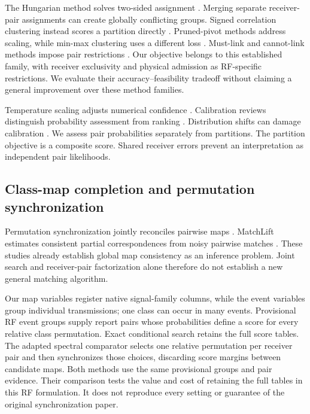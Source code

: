 The Hungarian method solves two-sided assignment \cite{kuhn}. Merging separate receiver-pair assignments can create globally conflicting groups. Signed correlation clustering instead scores a partition directly \cite{bansal}. Pruned-pivot methods address scaling, while min-max clustering uses a different loss \cite{dalirrooyfard2024,heidrich2024}. Must-link and cannot-link methods impose pair restrictions \cite{baumann2025}. Our objective belongs to this established family, with receiver exclusivity and physical admission as RF-specific restrictions. We evaluate their accuracy--feasibility tradeoff without claiming a general improvement over these method families.

Temperature scaling adjusts numerical confidence \cite{guo}. Calibration reviews distinguish probability assessment from ranking \cite{silvafilho2023,zhangwang2026}. Distribution shifts can damage calibration \cite{gawlikowski2023,seligmann2023,liang2024}. We assess pair probabilities separately from partitions. The partition objective is a composite score. Shared receiver errors prevent an interpretation as independent pair likelihoods.

\subsection{Class-map completion and permutation synchronization}
Permutation synchronization jointly reconciles pairwise maps \cite{pachauri2013}. MatchLift estimates consistent partial correspondences from noisy pairwise matches \cite{chen2014}. These studies already establish global map consistency as an inference problem. Joint search and receiver-pair factorization alone therefore do not establish a new general matching algorithm.

Our map variables register native signal-family columns, while the event variables group individual transmissions; one class can occur in many events. Provisional RF event groups supply report pairs whose probabilities define a score for every relative class permutation. Exact conditional search retains the full score tables. The adapted spectral comparator selects one relative permutation per receiver pair and then synchronizes those choices, discarding score margins between candidate maps. Both methods use the same provisional groups and pair evidence. Their comparison tests the value and cost of retaining the full tables in this RF formulation. It does not reproduce every setting or guarantee of the original synchronization paper.

